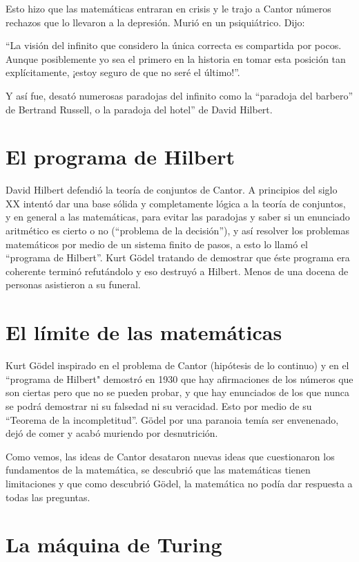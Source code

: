 ﻿\documentclass[journal,10pt,spanish]{IEEEtran}
\begin{document}
Esto hizo que las matemáticas entraran en crisis y le trajo a Cantor números rechazos que lo llevaron a la depresión. Murió en un psiquiátrico. Dijo:

“La visión del infinito que considero la única correcta es compartida por pocos. Aunque posiblemente yo sea el primero en la historia en tomar esta posición tan explícitamente, ¡estoy seguro de que no seré el último!”. \cite{sitio4}

Y así fue, desató numerosas paradojas del infinito como la “paradoja del barbero” de Bertrand Russell, o la paradoja del hotel” de David Hilbert.

\section{El programa de Hilbert}

David Hilbert defendió la teoría de conjuntos de Cantor.  A principios del siglo XX intentó dar una base sólida y completamente lógica a la teoría de conjuntos, y en general a las matemáticas, para evitar las paradojas y saber si un enunciado aritmético es cierto o no (“problema de la decisión”), y así resolver los problemas matemáticos por medio de un sistema finito de pasos, a esto lo llamó el “programa de Hilbert”. Kurt Gödel tratando de demostrar que éste programa era coherente terminó refutándolo y eso destruyó a Hilbert. Menos de una docena de personas asistieron a su funeral.\cite{sitio5}

\section{ El límite de las matemáticas}

Kurt Gödel inspirado en el problema de Cantor  (hipótesis de lo continuo) y en el “programa de Hilbert" demostró en 1930 que hay afirmaciones de los números que son ciertas pero que no se pueden probar, y que hay enunciados de los que nunca se podrá demostrar ni su falsedad ni su veracidad. Esto por medio de su “Teorema de la incompletitud”. Gödel por una paranoia temía ser envenenado, dejó de comer y acabó muriendo por desnutrición. \cite{sitio6}

Como vemos, las ideas de Cantor desataron nuevas ideas que cuestionaron los fundamentos de la matemática, se descubrió que las matemáticas tienen limitaciones y que como descubrió  Gödel,  la matemática no podía dar respuesta a todas las preguntas.

\section{ La máquina de Turing}
\end{document}
